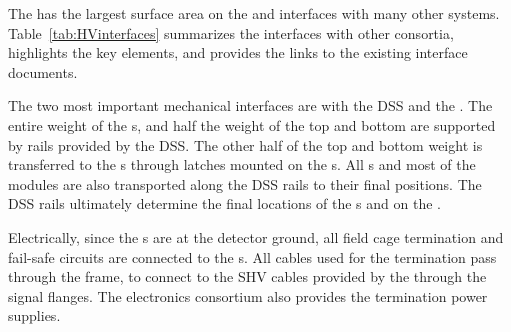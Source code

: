 The  has the largest surface area on the  and interfaces with many other systems.  Table~\ref{tab:HVinterfaces} summarizes the interfaces with other consortia, highlights the key elements, and provides the links to the existing interface documents.

The two most important mechanical interfaces are with the DSS and the .  The entire weight of the s,  and half the weight of the top and bottom  are supported by rails provided by the DSS.  The other half of the top and bottom  weight is transferred to the s through latches mounted on the s. All s and most of the  modules are also transported along the DSS rails to their final positions. The DSS rails ultimately determine the final locations of the s and  on the .

Electrically, since the s are at the detector ground, all  field cage termination and fail-safe circuits are connected to the s.  All cables used for the  termination pass through the  frame, to connect to the SHV cables provided by the  through the  signal flanges.  The  electronics consortium also provides  the  termination power supplies.

